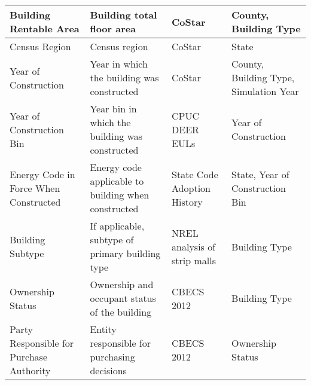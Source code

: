 \begin{center}
\begin{longtable}{|p{1.3in}|p{1.5in}|p{1.5in}|p{1.5in}|}
Building Rentable Area                                          & Building total floor area                                                      & CoStar                                                      & County, Building Type                                                                                \\ \hline
Census Region                                                   & Census region                                                                  & CoStar                                                      & State                                                                                                \\ \hline
Year of Construction                                            & Year in which the building was constructed                                     & CoStar                                                      & County, Building Type, Simulation Year                                                               \\ \hline
Year of Construction Bin                                        & Year bin in which the building was constructed                                 & CPUC DEER EULs                                              & Year of Construction                                                                                 \\ \hline
Energy Code in Force When Constructed                           & Energy code applicable to building when constructed                            & State Code Adoption History                                 & State, Year of Construction Bin                                                                      \\ \hline
Building Subtype                                               & If applicable, subtype of primary building type                                & NREL analysis of strip malls                                & Building Type                                                                                        \\ \hline
Ownership Status                                                & Ownership and occupant status of the building                                  & CBECS 2012                                                  & Building Type                                                                                        \\ \hline
Party Responsible for Purchase Authority                        & Entity responsible for purchasing decisions                                    & CBECS 2012                                                  & Ownership Status                                                                                     \\ \hline

\end{longtable}
\end{center}
